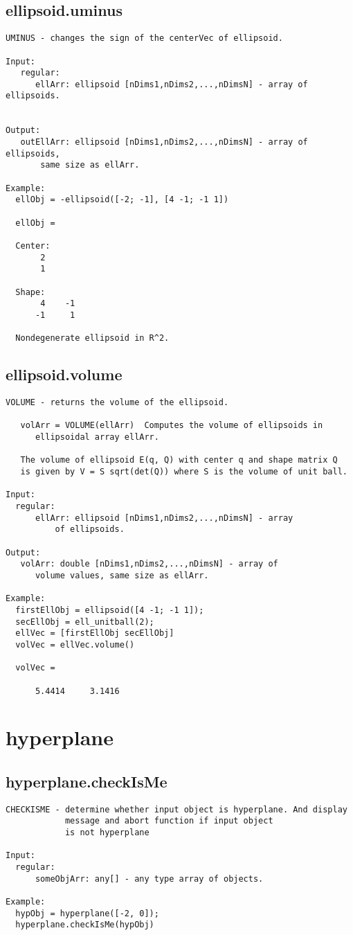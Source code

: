 \subsection{\texorpdfstring{ellipsoid.uminus}{uminus}}\label{method:ellipsoid.uminus}
\begin{verbatim}
UMINUS - changes the sign of the centerVec of ellipsoid.

Input:
   regular:
      ellArr: ellipsoid [nDims1,nDims2,...,nDimsN] - array of ellipsoids.


Output:
   outEllArr: ellipsoid [nDims1,nDims2,...,nDimsN] - array of ellipsoids,
       same size as ellArr.

Example:
  ellObj = -ellipsoid([-2; -1], [4 -1; -1 1])

  ellObj =

  Center:
       2
       1

  Shape:
       4    -1
      -1     1

  Nondegenerate ellipsoid in R^2.
\end{verbatim}
\subsection{\texorpdfstring{ellipsoid.volume}{volume}}\label{method:ellipsoid.volume}
\begin{verbatim}
VOLUME - returns the volume of the ellipsoid.

   volArr = VOLUME(ellArr)  Computes the volume of ellipsoids in
      ellipsoidal array ellArr.

   The volume of ellipsoid E(q, Q) with center q and shape matrix Q
   is given by V = S sqrt(det(Q)) where S is the volume of unit ball.

Input:
  regular:
      ellArr: ellipsoid [nDims1,nDims2,...,nDimsN] - array
          of ellipsoids.

Output:
   volArr: double [nDims1,nDims2,...,nDimsN] - array of
      volume values, same size as ellArr.

Example:
  firstEllObj = ellipsoid([4 -1; -1 1]);
  secEllObj = ell_unitball(2);
  ellVec = [firstEllObj secEllObj]
  volVec = ellVec.volume()

  volVec =

      5.4414     3.1416
\end{verbatim}
\section{hyperplane}\label{secClassDescr:hyperplane}
\subsection{\texorpdfstring{hyperplane.checkIsMe}{checkIsMe}}\label{method:hyperplane.checkIsMe}
\begin{verbatim}
CHECKISME - determine whether input object is hyperplane. And display
            message and abort function if input object
            is not hyperplane

Input:
  regular:
      someObjArr: any[] - any type array of objects.

Example:
  hypObj = hyperplane([-2, 0]);
  hyperplane.checkIsMe(hypObj)
\end{verbatim}
